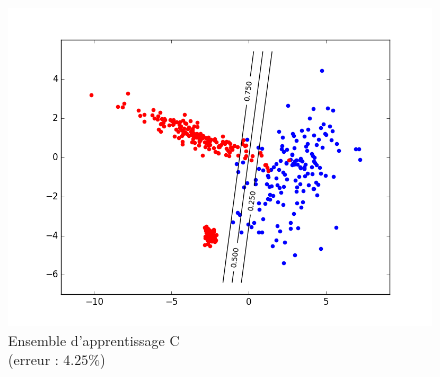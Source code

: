 \documentclass[paper=a4, fontsize=11pt]{article}
\begin{document}
\begin{figure}[h]
 \begin{minipage}[b]{.3\linewidth}
  \includegraphics[scale=0.25]{figures/log_reg_C_train.png}
  \caption*{Ensemble d'apprentissage C \\ (erreur : $4.25\%$)}
 \end{minipage}
\end{figure}
\end{document}
